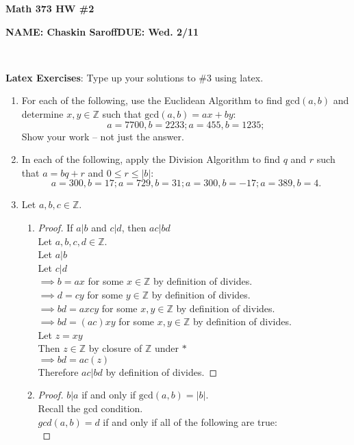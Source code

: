 \documentclass[11 pt]{article}
\theoremstyle{definition}
\theoremstyle{definition}
\def\ZZ{\mathbb{Z}}
\def\divides{\big |}
\def\gcd#1#2{\textrm{gcd}({#1},{#2})}
\def\ord#1{|{#1}|}
\begin{document}
\centerline{\bf Math 373  \hfill HW \#2}
\centerline{\bf NAME: Chaskin Saroff\hfill DUE: Wed. 2/11}


\

\noindent
{\bf Latex Exercises}: Type up your solutions to \#3 using latex.

\begin{enumerate}
\item For each of the following, use the Euclidean Algorithm to find $\gcd a b$ and determine $x, y \in \ZZ$ such that $\gcd a b = ax + by$:
%
$$
a = 7700, b = 2233; a = 455, b = 1235; 
$$
%
Show your work -- not just the answer.

\item In each of the following, apply the Division Algorithm to find $q$ and $r$ such that $a = bq + r$ and $0 \leq r \leq \ord b$:
%
$$
a = 300, b = 17; a = 729, b = 31; a = 300, b = -17; a = 389, b = 4.
$$

\pagebreak%
\item Let $a, b, c \in \ZZ$.  
	\begin{enumerate}
	\item 
        \begin{proof} If $a \divides b$ and $c \divides d$, then $ac \divides bd$\\
            Let $a,b,c,d \in \ZZ$.\\
            Let $a \divides b$\\
            Let $c \divides d$\\
            $\implies b = ax$ for some $x \in \ZZ$ by definition of divides.\\
            $\implies d = cy$ for some $y \in \ZZ$ by definition of divides.\\
            $\implies bd = axcy$ for some $x,y \in \ZZ$ by definition of divides.\\
            $\implies bd = (ac)xy$ for some $x,y \in \ZZ$ by definition of divides.\\
            Let $z=xy$\\
            Then $z \in \ZZ$ by closure of $\ZZ$ under $*$\\
            $\implies bd=ac(z)$\\
            Therefore $ac \divides bd$ by definition of divides.
        \end{proof}
        \pagebreak%
        \item 
        \begin{proof} $b \divides a$ if and only if $\gcd a b = \ord b$.\\
                Recall the gcd condition.\\
                $gcd(a,b)=d$ if and only if all of the following are true:\\


\end{proof}
\end{enumerate}
\end{enumerate}
\end{document}
